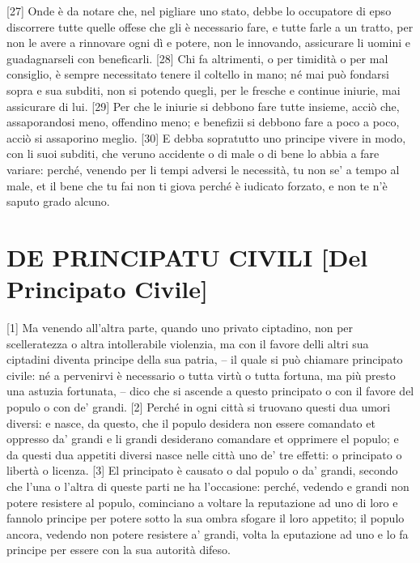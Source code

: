 {[}27{]} Onde è da notare che, nel pigliare uno stato, debbe lo
occupatore di epso discorrere tutte quelle offese che gli è necessario
fare, e tutte farle a un tratto, per non le avere a rinnovare ogni dì e
potere, non le innovando, assicurare li uomini e guadagnarseli con
beneficarli. {[}28{]} Chi fa altrimenti, o per timidità o per mal
consiglio, è sempre necessitato tenere il coltello in mano; né mai può
fondarsi sopra e sua subditi, non si potendo quegli, per le fresche e
continue iniurie, mai assicurare di lui. {[}29{]} Per che le iniurie si
debbono fare tutte insieme, acciò che, assaporandosi meno, offendino
meno; e benefizii si debbono fare a poco a poco, acciò si assaporino
meglio. {[}30{]} E debba sopratutto uno principe vivere in modo, con li
suoi subditi, che veruno accidente o di male o di bene lo abbia a fare
variare: perché, venendo per li tempi adversi le necessità, tu non se' a
tempo al male, et il bene che tu fai non ti giova perché è iudicato
forzato, e non te n'è saputo grado alcuno.

\quebra\section{DE PRINCIPATU CIVILI\break
{[}Del Principato Civile{]}}

{[}1{]} Ma venendo all'altra parte, quando uno privato ciptadino, non
per scelleratezza o altra intollerabile violenzia, ma con il favore
delli altri sua ciptadini diventa principe della sua patria, -- il quale
si può chiamare principato civile: né a pervenirvi è necessario o tutta
virtù o tutta fortuna, ma più presto una astuzia fortunata, -- dico che si ascende a questo principato o con il favore del populo o con de' grandi. {[}2{]} Perché in ogni città si truovano questi dua umori diversi: e nasce, da questo, che il populo desidera non essere comandato et oppresso da' grandi e li grandi desiderano comandare et opprimere el populo; e da questi dua appetiti diversi nasce nelle città uno de' tre effetti: o principato o libertà o licenza. {[}3{]} El principato è causato o dal populo o da' grandi, secondo che l'una o l'altra di queste parti ne ha l'occasione: perché, vedendo e grandi non potere resistere al populo, cominciano a voltare la reputazione ad uno di loro e fannolo principe per potere sotto la sua ombra sfogare il loro appetito; il populo ancora, vedendo non potere resistere a' grandi, volta la eputazione ad uno e lo fa principe per essere con la sua autorità difeso.

